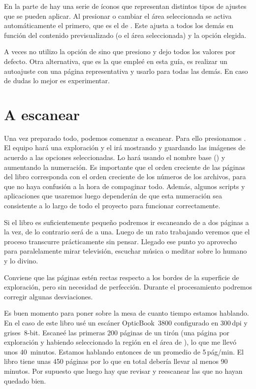 \documentclass[%
	a5paper,
	10pt,
	twoside,
	openright,
	final,
]{memoir}
\begin{document}
	En la parte de  hay una serie de íconos que representan distintos tipos de ajustes que se pueden aplicar. Al presionar  o cambiar el área seleccionada se activa automáticamente el primero, que es el de . Este ajusta a todos los demás en función del contenido previsualizado (o el área seleccionada) y la opción  elegida.

	A veces no utilizo la opción de  sino que presiono  y dejo todos los valores por defecto. Otra alternativa, que es la que empleé en esta guía, es realizar un autoajuste con una página representativa y usarlo para todas las demás. En caso de dudas lo mejor es experimentar.

	\section{A escanear} Una vez preparado todo, podemos comenzar a escanear. Para ello presionamos . El equipo hará una exploración y el \irfanview irá mostrando y guardando las imágenes de acuerdo a las opciones seleccionadas. Lo hará usando el nombre base () y aumentando la numeración. Es importante que el orden creciente de las páginas del libro corresponda con el orden creciente de los números de los archivos, para que no haya confusión a la hora de compaginar todo. Además, algunos scripts y aplicaciones que usaremos luego dependerán de que esta numeración sea consistente a lo largo de todo el proyecto para funcionar correctamente.

	Si el libro es suficientemente pequeño podremos ir escaneando de a dos páginas a la vez, de lo contrario será de a una. Luego de un rato trabajando veremos que el proceso transcurre prácticamente sin pensar. Llegado ese punto yo aprovecho para paralelamente mirar televisión, escuchar música o meditar sobre lo humano y lo divino.

	Conviene que las páginas estén rectas respecto a los bordes de la superficie de exploración, pero sin necesidad de perfección. Durante el procesamiento podremos corregir algunas desviaciones.

	Es buen momento para poner sobre la mesa de cuanto tiempo estamos hablando. En el caso de este libro usé un escáner OpticBook~3800 configurado en 300\,dpi y grises~8-bit. Escaneé las primeras 200 páginas de un tirón (una página por exploración y habiendo seleccionado la región en el área de ), lo que me llevó unos 40~minutos. Estamos hablando entonces de un promedio de 5\,pág/min. El libro tiene unas 450 páginas por lo que en total debería llevar al menos 90 minutos. Por supuesto que luego hay que revisar y reescanear las que no hayan quedado bien.
\end{document}
